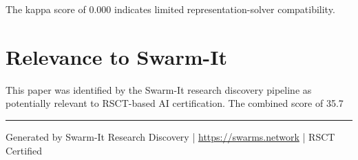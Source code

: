 \documentclass[11pt,a4paper]{article}
\begin{document}
The kappa score of 0.000 indicates limited representation-solver compatibility.


\section{Relevance to Swarm-It}
This paper was identified by the Swarm-It research discovery pipeline as potentially relevant to RSCT-based AI certification. The combined score of 35.7%

\vspace{1em}
\hrule
\vspace{0.5em}
\small{Generated by Swarm-It Research Discovery | \url{https://swarms.network} | RSCT Certified}
\end{document}

